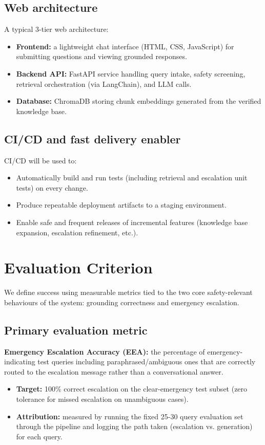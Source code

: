 \documentclass[11pt,a4paper]{article}
\begin{document}
\subsection{Web architecture}
A typical 3-tier web architecture:
\begin{itemize}
    \item \textbf{Frontend:} a lightweight chat interface (HTML, CSS, JavaScript) for submitting questions and viewing grounded responses.
    \item \textbf{Backend API:} FastAPI service handling query intake, safety screening, retrieval orchestration (via LangChain), and LLM calls.
    \item \textbf{Database:} ChromaDB storing chunk embeddings generated from the verified knowledge base.
\end{itemize}

\subsection{CI/CD and fast delivery enabler}
CI/CD will be used to:
\begin{itemize}
    \item Automatically build and run tests (including retrieval and escalation unit tests) on every change.
    \item Produce repeatable deployment artifacts to a staging environment.
    \item Enable safe and frequent releases of incremental features (knowledge base expansion, escalation refinement, etc.).
\end{itemize}

\section{Evaluation Criterion}
We define success using measurable metrics tied to the two core safety-relevant behaviours of the system: grounding correctness and emergency escalation.

\subsection{Primary evaluation metric}
\textbf{Emergency Escalation Accuracy (EEA):} the percentage of emergency-indicating test queries including paraphrased/ambiguous ones that are correctly routed to the escalation message rather than a conversational answer.
\begin{itemize}
    \item \textbf{Target:} 100\% correct escalation on the clear-emergency test subset (zero tolerance for missed escalation on unambiguous cases).
    \item \textbf{Attribution:} measured by running the fixed 25-30 query evaluation set through the pipeline and logging the path taken (escalation vs. generation) for each query.
\end{itemize}
\end{document}
